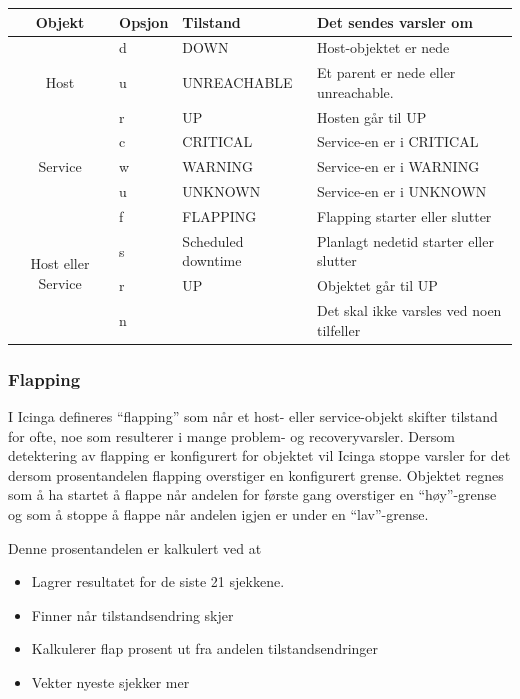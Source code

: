\begin{table}
\begin{center}
\begin{tabular}{| c | l | l | p{7cm} |}
        \hline
        \textbf{Objekt} & \textbf{Opsjon} & \textbf{Tilstand} & \textbf{Det sendes varsler om}
        \\ \hline
	\multirow{3}{*}{Host} & d & DOWN 			& Host-objektet er nede 			\\ \cline{2-4}
					    & u & UNREACHABLE 		& Et parent er nede eller unreachable.		\\ \cline{2-4}	
					    & r & UP 			& Hosten går til UP				\\ \hline 
        \multirow{3}{*}{Service} 	    & c & CRITICAL 		& Service-en er i CRITICAL 			\\ \cline{2-4}
					    & w & WARNING  		& Service-en er i WARNING  			\\ \cline{2-4}
					    & u & UNKNOWN  		& Service-en er i UNKNOWN  			\\ \hline
	\multirow{4}{*}{Host eller Service} & f & FLAPPING           	& Flapping starter eller slutter 		\\ \cline{2-4}
					    & s & Scheduled downtime 	& Planlagt nedetid starter eller slutter 	\\ \cline{2-4}
				 	    & r & UP                 	& Objektet går til UP 				\\ \cline{2-4}  
					    & n &                    	& Det skal ikke varsles ved noen tilfeller 	\\ \cline{2-4}

	\hline
\end{tabular}
\label{objekt_varsling}
\end{center}
\end{table}


\subsubsection{Flapping}
I Icinga defineres “flapping” som når et host- eller service-objekt skifter tilstand for ofte, noe som resulterer i mange problem- og recoveryvarsler. \cite{icingaflapping} Dersom detektering av flapping er konfigurert for objektet vil Icinga stoppe varsler for det dersom prosentandelen flapping overstiger en konfigurert grense. Objektet regnes som å ha startet å flappe når andelen for første gang overstiger en “høy”-grense og som å stoppe å flappe når andelen igjen er under en “lav”-grense.

Denne prosentandelen er kalkulert ved at
\begin{itemize}
	\item Lagrer resultatet for de siste 21 sjekkene.
	\item Finner når tilstandsendring skjer 
	\item Kalkulerer flap prosent ut fra andelen tilstandsendringer
	\item Vekter nyeste sjekker mer
\end{itemize}

